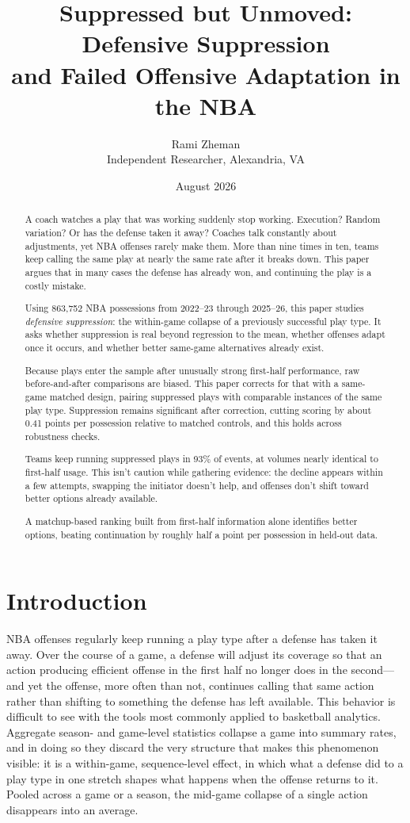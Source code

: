 \documentclass[11pt]{article}
\title{Suppressed but Unmoved: Defensive Suppression \\ and Failed Offensive Adaptation in the NBA}
\author{Rami Zheman \\ Independent Researcher, Alexandria, VA}
\date{August 2026}
\begin{document}
\maketitle

\begin{abstract}
A coach watches a play that was working suddenly stop working. Execution? Random variation? Or has the defense taken it away? Coaches talk constantly about adjustments, yet NBA offenses rarely make them. More than nine times in ten, teams keep calling the same play at nearly the same rate after it breaks down. This paper argues that in many cases the defense has already won, and continuing the play is a costly mistake.

Using 863{,}752 NBA possessions from 2022--23 through 2025--26, this paper studies \emph{defensive suppression}: the within-game collapse of a previously successful play type. It asks whether suppression is real beyond regression to the mean, whether offenses adapt once it occurs, and whether better same-game alternatives already exist.

Because plays enter the sample after unusually strong first-half performance, raw before-and-after comparisons are biased. This paper corrects for that with a same-game matched design, pairing suppressed plays with comparable instances of the same play type. Suppression remains significant after correction, cutting scoring by about 0.41 points per possession relative to matched controls, and this holds across robustness checks.

Teams keep running suppressed plays in 93\% of events, at volumes nearly identical to first-half usage. This isn't caution while gathering evidence: the decline appears within a few attempts, swapping the initiator doesn't help, and offenses don't shift toward better options already available.

A matchup-based ranking built from first-half information alone identifies better options, beating continuation by roughly half a point per possession in held-out data.
\end{abstract}

\section{Introduction}

NBA offenses regularly keep running a play type after a defense has taken it away. Over the course of a game, a defense will adjust its coverage so that an action producing efficient offense in the first half no longer does in the second---and yet the offense, more often than not, continues calling that same action rather than shifting to something the defense has left available. This behavior is difficult to see with the tools most commonly applied to basketball analytics. Aggregate season- and game-level statistics collapse a game into summary rates, and in doing so they discard the very structure that makes this phenomenon visible: it is a within-game, sequence-level effect, in which what a defense did to a play type in one stretch shapes what happens when the offense returns to it. Pooled across a game or a season, the mid-game collapse of a single action disappears into an average.
\end{document}
